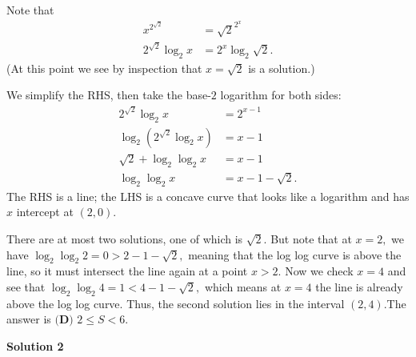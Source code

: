 \begin{enumerate}
Note that
 \begin{align*} x^{2^{\sqrt{2}}} &= {\sqrt{2}}^{2^x} \\ 2^{\sqrt{2}} \log_2 x &= 2^{x} \log_2 \sqrt{2}. \end{align*}
(At this point we see by inspection that $x=\sqrt{2}$ is a solution.)

 We simplify the RHS, then take the base-$2$ logarithm for both sides:
 \begin{align*} 2^{\sqrt{2}} \log_2 x &= 2^{x-1} \\ \log_2{\left(2^{\sqrt{2}} \log_2 x\right)} &= x-1 \\ \sqrt{2} + \log_2 \log_2 x &= x-1 \\ \log_2 \log_2 x &= x - 1 - \sqrt{2}. \end{align*}
The RHS is a line; the LHS is a concave curve that looks like a logarithm and has $x$ intercept at $(2,0).$

 There are at most two solutions, one of which is $\sqrt{2}.$ But note that at $x=2,$ we have $\log_2 \log_2 {2} = 0 > 2 - 1 - \sqrt{2},$ meaning that the log log curve is above the line, so it must intersect the line again at a point $x > 2.$ Now we check $x=4$ and see that $\log_2 \log_2 {4} = 1 < 4 - 1 - \sqrt{2},$ which means at $x=4$ the line is already above the log log curve. Thus, the second solution lies in the interval $(2,4).$The answer is $\boxed{\textbf{(D) }2\le S<6}.$




\textbf{Solution 2}


\end{enumerate}
